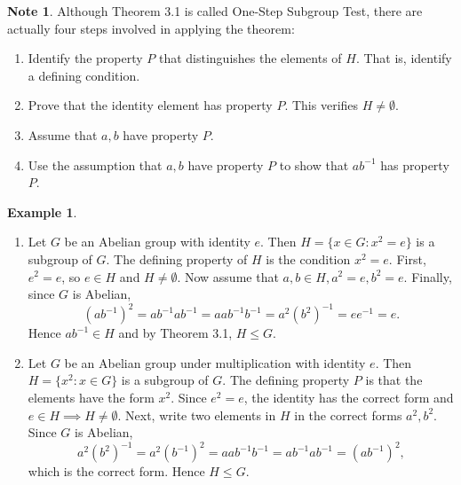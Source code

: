 \documentclass{article}
\newtheorem{theorem}{Theorem}[section]
\theoremstyle{definition}
\newtheorem{example}{Example}[section]
\newtheorem{note}{Note}[section]
\begin{document}
    \begin{note}
       Although Theorem 3.1 is called One-Step Subgroup Test, there are actually four steps involved in applying the theorem:
    \begin{enumerate}
        \item Identify the property $P$ that distinguishes the elements of $H$. That is, identify a defining condition.
        \item Prove that the identity element has property $P$. This verifies $H \neq \emptyset$.
        \item Assume that $a,b$ have property $P$.
        \item Use the assumption that $a,b$ have property $P$ to show that $ab^{-1}$ has property $P$.
    \end{enumerate}
    \end{note}
    
    
    \begin{example}
    \begin{enumerate}
        \item Let $G$ be an Abelian group with identity $e$. Then $H = \{x \in G: x^2=e\}$ is a subgroup of $G$. The defining property of $H$ is the condition $x^2=e$. First, $e^2=e$, so $e \in H$ and $H \neq \emptyset$. Now assume that $a,b \in H,a^2=e,b^2=e$. Finally, since $G$ is Abelian,
        \begin{equation*}
            (ab^{-1})^2 = ab^{-1}ab^{-1} = aab^{-1}b^{-1} = a^2(b^2)^{-1} = ee^{-1} = e.
        \end{equation*}
        Hence $ab^{-1} \in H$ and by Theorem 3.1, $H \leq G$.
        
        \item Let $G$ be an Abelian group under multiplication with identity $e$. Then $H = \{x^2:x \in G\}$ is a subgroup of $G$. The defining property $P$ is that the elements have the form $x^2$. Since $e^2=e$, the identity has the correct form and $e \in H \implies H \neq \emptyset$. Next, write two elements in $H$ in the correct forms $a^2,b^2$. Since $G$ is Abelian,
        \begin{equation*}
            a^2(b^2)^{-1} = a^2(b^{-1})^2 = aab^{-1}b^{-1} = ab^{-1}ab^{-1} = (ab^{-1})^2,
        \end{equation*}
        which is the correct form. Hence $H \leq G$.
    \end{enumerate}
    \end{example}
    
    \noindent{}
    
\end{document}
